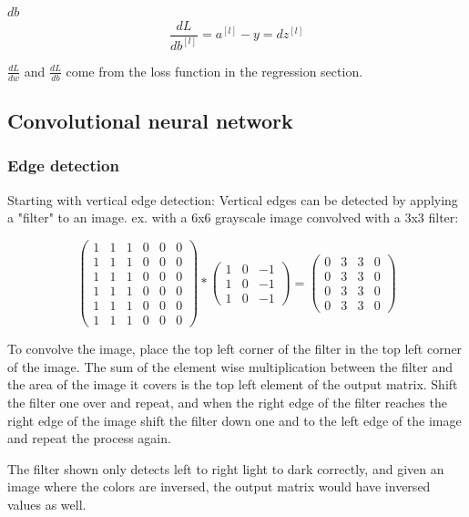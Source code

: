 \documentclass[12pt]{article}
\begin{document}
$db$
\[ \frac{dL}{db^{[l]}} = a^{[l]}-y = dz^{[l]} \]

$\frac{dL}{dw}$ and $\frac{dL}{db}$ come from the loss function in the regression section.

\subsection{Convolutional neural network}

\subsubsection{Edge detection}

Starting with vertical edge detection: Vertical edges can be detected by applying
a "filter" to an image. ex. with a 6x6 grayscale image convolved with a 3x3 filter:

\[
    \begin{pmatrix}
        1 & 1 & 1 & 0 & 0 & 0\\
        1 & 1 & 1 & 0 & 0 & 0\\
        1 & 1 & 1 & 0 & 0 & 0\\
        1 & 1 & 1 & 0 & 0 & 0\\
        1 & 1 & 1 & 0 & 0 & 0\\
        1 & 1 & 1 & 0 & 0 & 0
    \end{pmatrix}
    *
    \begin{pmatrix}
        1 & 0 & -1\\
        1 & 0 & -1\\
        1 & 0 & -1
    \end{pmatrix}
    =
    \begin{pmatrix}
        0 & 3 & 3 & 0\\
        0 & 3 & 3 & 0\\
        0 & 3 & 3 & 0\\
        0 & 3 & 3 & 0
    \end{pmatrix}
\]

To convolve the image, place the top left corner of the filter in the top left corner of
the image. The sum of the element wise multiplication between the filter and the area of
the image it covers is the top left element of the output matrix. Shift the filter one over
and repeat, and when the right edge of the filter reaches the right edge of the image shift
the filter down one and to the left edge of the image and repeat the process again.

The filter shown only detects left to right light to dark correctly, and given an image where
the colors are inversed, the output matrix would have inversed values as well.
\end{document}
